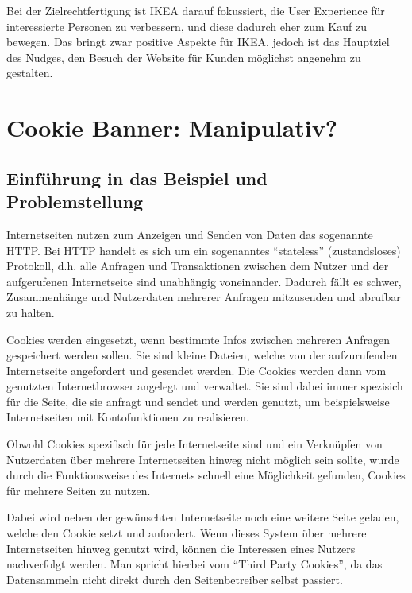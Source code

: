Bei der Zielrechtfertigung ist IKEA darauf fokussiert, die User Experience für interessierte Personen zu verbessern, und diese dadurch eher zum Kauf zu bewegen. Das bringt zwar positive Aspekte für IKEA, jedoch ist das Hauptziel des Nudges, den Besuch der Website für Kunden möglichst angenehm zu gestalten.

\section{Cookie Banner: Manipulativ?}
\subsection{Einführung in das Beispiel und Problemstellung}
Internetseiten nutzen zum Anzeigen und Senden von Daten das sogenannte \ac{HTTP}. Bei \ac{HTTP} handelt es sich um ein sogenanntes ``stateless'' (zustandsloses) Protokoll, d.h. alle Anfragen und Transaktionen zwischen dem Nutzer und der aufgerufenen Internetseite sind unabhängig voneinander. Dadurch fällt es schwer, Zusammenhänge und Nutzerdaten mehrerer Anfragen mitzusenden und abrufbar zu halten.

Cookies werden eingesetzt, wenn bestimmte Infos zwischen mehreren Anfragen gespeichert werden sollen. Sie sind kleine Dateien, welche von der aufzurufenden Internetseite angefordert und gesendet werden. Die Cookies werden dann vom genutzten Internetbrowser angelegt und verwaltet. Sie sind dabei immer spezisich für die Seite, die sie anfragt und sendet und werden genutzt, um beispielsweise Internetseiten mit Kontofunktionen zu realisieren. \parencite[S. 4-6]{Kristol.}

Obwohl Cookies spezifisch für jede Internetseite sind und ein Verknüpfen von Nutzerdaten über mehrere Internetseiten hinweg nicht möglich sein sollte, wurde durch die Funktionsweise des Internets schnell eine Möglichkeit gefunden, Cookies für mehrere Seiten zu nutzen.

Dabei wird neben der gewünschten Internetseite noch eine weitere Seite geladen, welche den Cookie setzt und anfordert. Wenn dieses System über mehrere Internetseiten hinweg genutzt wird, können die Interessen eines Nutzers nachverfolgt werden. Man spricht hierbei vom ``Third Party Cookies'', da das Datensammeln nicht direkt durch den Seitenbetreiber selbst passiert. \parencite[S. 2608]{Bielova.2017}

